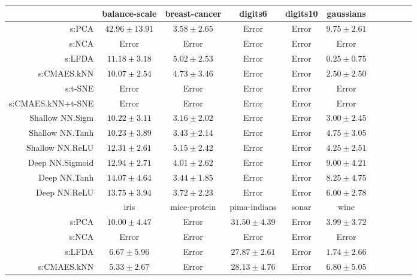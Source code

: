 \begin{table}[ht] \centering
{\small\renewcommand{\arraystretch}{0.95}
\setlength{\tabcolsep}{1pt}
\begin{tabular}{rcccccccccc}
\toprule


& \multicolumn{1}{c}{balance-scale} & \multicolumn{1}{c}{breast-cancer} & \multicolumn{1}{c}{digits6} & \multicolumn{1}{c}{digits10} & \multicolumn{1}{c}{gaussians} \\ 
\midrule
s:PCA & $42.96\pm13.91$ & $3.58\pm2.65$ & Error  & Error  & $9.75\pm2.61$ \\
s:NCA & Error  & Error  & Error  & Error  & Error  \\
s:LFDA & $11.18\pm3.18$ & $5.02\pm2.53$ & Error  & Error  & $\bm{0.25\pm0.75}$ \\
s:CMAES.kNN & $\bm{10.07\pm2.54}$ & $4.73\pm3.46$ & Error  & Error  & $2.50\pm2.50$ \\
s:t-SNE & Error  & Error  & Error  & Error  & Error  \\
s:CMAES.kNN+t-SNE & Error  & Error  & Error  & Error  & Error  \\
Shallow NN.Sigm & $10.22\pm3.11$ & $\bm{3.16\pm2.02}$ & Error  & Error  & $3.00\pm2.45$ \\
Shallow NN.Tanh & $10.23\pm3.89$ & $3.43\pm2.14$ & Error  & Error  & $4.75\pm3.05$ \\
Shallow NN.ReLU & $12.31\pm2.61$ & $5.15\pm2.42$ & Error  & Error  & $4.25\pm2.51$ \\
Deep NN.Sigmoid & $12.94\pm2.71$ & $4.01\pm2.62$ & Error  & Error  & $9.00\pm4.21$ \\
Deep NN.Tanh & $14.07\pm4.64$ & $3.44\pm1.85$ & Error  & Error  & $8.25\pm4.75$ \\
Deep NN.ReLU & $13.75\pm3.94$ & $3.72\pm2.23$ & Error  & Error  & $6.00\pm2.78$ \\
\midrule
& \multicolumn{1}{c}{iris} & \multicolumn{1}{c}{mice-protein} & \multicolumn{1}{c}{pima-indians} & \multicolumn{1}{c}{sonar} & \multicolumn{1}{c}{wine} \\ 
\midrule
s:PCA & $10.00\pm4.47$ & Error  & $31.50\pm4.39$ & Error  & $3.99\pm3.72$ \\
s:NCA & Error  & Error  & Error  & Error  & Error  \\
s:LFDA & $6.67\pm5.96$ & Error  & $27.87\pm2.61$ & Error  & $\bm{1.74\pm2.66}$ \\
s:CMAES.kNN & $5.33\pm2.67$ & Error  & $28.13\pm4.76$ & Error  & $6.80\pm5.05$ \\

\end{tabular}}
\end{table}
